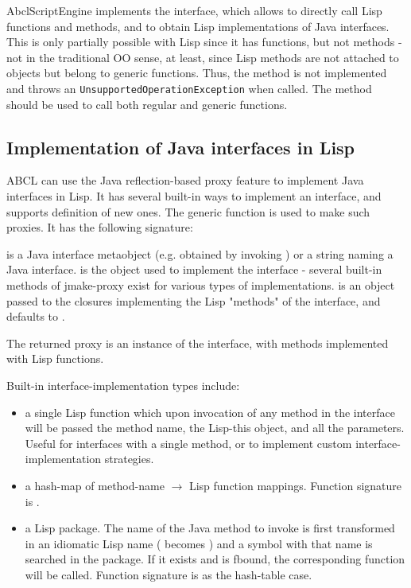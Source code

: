 \documentclass[10pt]{book}
\begin{document}
AbclScriptEngine implements the 
interface, which allows to directly call Lisp functions and methods,
and to obtain Lisp implementations of Java interfaces. This is only
partially possible with Lisp since it has functions, but not methods -
not in the traditional OO sense, at least, since Lisp methods are not
attached to objects but belong to generic functions. Thus, the method
 is not implemented and throws an
\texttt{UnsupportedOperationException} when called. The 
method should be used to call both regular and generic functions.

\subsection{Implementation of Java interfaces in Lisp}

ABCL can use the Java reflection-based proxy feature to implement Java
interfaces in Lisp. It has several built-in ways to implement an
interface, and supports definition of new ones. The
 generic function is used to make such
proxies. It has the following signature:


 is a Java interface metaobject (e.g. obtained by
invoking ) or a string naming a Java
interface.  is the object used to implement the
interface - several built-in methods of jmake-proxy exist for various
types of implementations.  is an object passed to the
closures implementing the Lisp "methods" of the interface, and
defaults to .

The returned proxy is an instance of the interface, with methods
implemented with Lisp functions.

Built-in interface-implementation types include:

\begin{itemize}
\item a single Lisp function which upon invocation of any method in
  the interface will be passed the method name, the Lisp-this object,
  and all the parameters. Useful for interfaces with a single method,
  or to implement custom interface-implementation strategies.
\item a hash-map of method-name $\rightarrow$ Lisp function mappings. Function
  signature is .
\item a Lisp package. The name of the Java method to invoke is first
  transformed in an idiomatic Lisp name ( becomes
  ) and a symbol with that name is searched in
  the package. If it exists and is fbound, the corresponding function
  will be called. Function signature is as the hash-table case.
\end{itemize}
\end{document}
